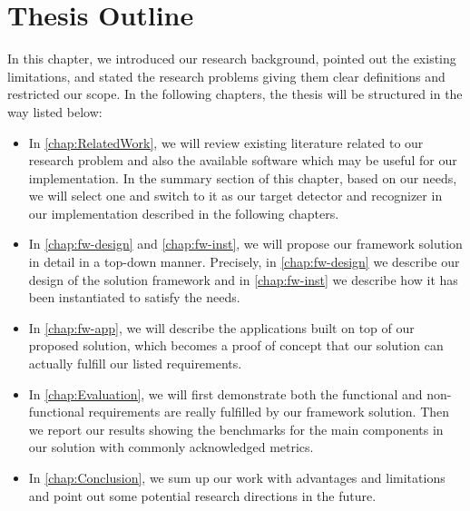 
\section{Thesis Outline}
\label{sec:intro-outline}

In this chapter, we introduced our research background, pointed out the
existing limitations, and stated the research problems giving them clear
definitions and restricted our scope.
In the following chapters, the thesis will be structured in the way listed
below:

\begin{itemize}
    \item In \autoref{chap:RelatedWork}, we will review existing literature
    related to our research problem and also the available software which may be
    useful for our implementation. In the summary section of this chapter,
    based on our needs, we will select one and switch to it as our target 
    detector and recognizer in our implementation described in the following
    chapters.

    \item In \autoref{chap:fw-design} and \autoref{chap:fw-inst}, we will 
    propose our framework solution in detail in a top-down manner. 
    Precisely, in \autoref{chap:fw-design} we describe our design of the
    solution framework and in \autoref{chap:fw-inst} we describe how it has been
    instantiated to satisfy the needs.

    \item In \autoref{chap:fw-app}, we will describe the applications built on
    top of our proposed solution, which becomes a proof of concept that our
    solution can actually fulfill our listed requirements.

    \item In \autoref{chap:Evaluation}, we will first demonstrate both the
    functional and non-functional requirements are really fulfilled by our
    framework solution. Then we report our results showing the benchmarks for 
    the main components in our solution with commonly acknowledged metrics.

    \item In \autoref{chap:Conclusion}, we sum up our work with advantages and
	limitations and point out some potential research directions in the future.
\end{itemize}

